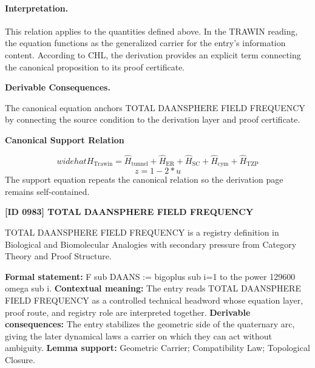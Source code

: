 \paragraph{Interpretation.}
This relation applies to the quantities defined above. In the TRAWIN reading, the equation functions as the generalized carrier for the entry’s information content. According to CHL, the derivation provides an explicit term connecting the canonical proposition to its proof certificate.

\par\vspace{0.35em}
\noindent\textbf{Derivable Consequences.}\quad
\begingroup
\footnotesize
\raggedright
The canonical equation anchors TOTAL DAANSPHERE FIELD FREQUENCY by connecting the source condition to the derivation layer and proof certificate.
\par\endgroup

\noindent\textbf{Canonical Support Relation}\par
\[
widehat{H}_{\mathrm{Trawin}} = \widehat{H}_{\mathrm{tunnel}} + \widehat{H}_{\mathrm{ER}} + \widehat{H}_{\mathrm{SC}} + \widehat{H}_{\mathrm{cym}} + \widehat{H}_{\mathrm{TZP}}
\]
\[
z = 1 - 2*u
\]
\noindent The support equation repeats the canonical relation so the derivation page remains self-contained.\par

\clearpage
\noindent\textbf{[ID 0983] TOTAL DAANSPHERE FIELD FREQUENCY}\par
\vspace{0.35em}
\begingroup\small
{}
TOTAL DAANSPHERE FIELD FREQUENCY is a registry definition in Biological and Biomolecular Analogies with secondary pressure from Category Theory and Proof Structure.

\begingroup\footnotesize\setlength{\emergencystretch}{3em}\sloppy
\textbf{Formal statement:} F sub DAANS := bigoplus sub i=1 to the power 129600 omega sub i. \textbf{Contextual meaning:} The entry reads TOTAL DAANSPHERE FIELD FREQUENCY as a controlled technical headword whose equation layer, proof route, and registry role are interpreted together. \textbf{Derivable consequences:} The entry stabilizes the geometric side of the quaternary arc, giving the later dynamical laws a carrier on which they can act without ambiguity. \textbf{Lemma support:} Geometric Carrier; Compatibility Law; Topological Closure.\par
\endgroup

